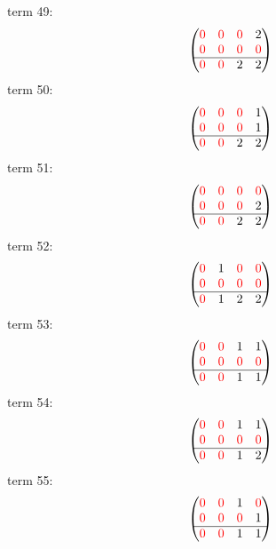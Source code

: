 \documentclass{article}
\begin{document}
term 49:
$$\begin{pmatrix}{\color{red} 0} & {\color{red} 0} & {\color{red} 0} & 2\\
{\color{red} 0} & {\color{red} 0} & {\color{red} 0} & {\color{red} 0}\\
\hline{\color{red} 0} & {\color{red} 0} & 2 & 2\\
\end{pmatrix}$$
term 50:
$$\begin{pmatrix}{\color{red} 0} & {\color{red} 0} & {\color{red} 0} & 1\\
{\color{red} 0} & {\color{red} 0} & {\color{red} 0} & 1\\
\hline{\color{red} 0} & {\color{red} 0} & 2 & 2\\
\end{pmatrix}$$
term 51:
$$\begin{pmatrix}{\color{red} 0} & {\color{red} 0} & {\color{red} 0} & {\color{red} 0}\\
{\color{red} 0} & {\color{red} 0} & {\color{red} 0} & 2\\
\hline{\color{red} 0} & {\color{red} 0} & 2 & 2\\
\end{pmatrix}$$
term 52:
$$\begin{pmatrix}{\color{red} 0} & 1 & {\color{red} 0} & {\color{red} 0}\\
{\color{red} 0} & {\color{red} 0} & {\color{red} 0} & {\color{red} 0}\\
\hline{\color{red} 0} & 1 & 2 & 2\\
\end{pmatrix}$$
term 53:
$$\begin{pmatrix}{\color{red} 0} & {\color{red} 0} & 1 & 1\\
{\color{red} 0} & {\color{red} 0} & {\color{red} 0} & {\color{red} 0}\\
\hline{\color{red} 0} & {\color{red} 0} & 1 & 1\\
\end{pmatrix}$$
term 54:
$$\begin{pmatrix}{\color{red} 0} & {\color{red} 0} & 1 & 1\\
{\color{red} 0} & {\color{red} 0} & {\color{red} 0} & {\color{red} 0}\\
\hline{\color{red} 0} & {\color{red} 0} & 1 & 2\\
\end{pmatrix}$$
term 55:
$$\begin{pmatrix}{\color{red} 0} & {\color{red} 0} & 1 & {\color{red} 0}\\
{\color{red} 0} & {\color{red} 0} & {\color{red} 0} & 1\\
\hline{\color{red} 0} & {\color{red} 0} & 1 & 1\\
\end{pmatrix}$$
\end{document}
